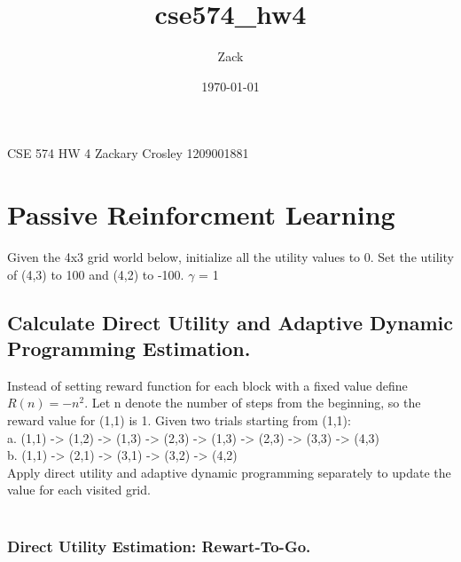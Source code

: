 \documentclass[a4paper]{article}
\author{Zack}
\date{\today}
\title{cse574\_hw4}
\begin{document}
\maketitle
\tableofcontents

CSE 574
HW 4
Zackary Crosley
1209001881

\section{Passive Reinforcment Learning}
\label{sec-1}
Given the 4x3 grid world below, initialize all the utility values to 0. Set the utility of (4,3) to 100 and (4,2) to -100. $\gamma$ = 1

\subsection{Calculate Direct Utility and Adaptive Dynamic Programming Estimation.}
\label{sec-1-1}
Instead of setting reward function for each block with a fixed value define $R(n) = -n^2$. Let n denote the number of steps from the beginning, so the reward value for (1,1) is 1. Given two trials starting from (1,1): \\
   a. (1,1) -> (1,2) -> (1,3) -> (2,3) -> (1,3) -> (2,3) -> (3,3) -> (4,3) \\
   b. (1,1) -> (2,1) -> (3,1) -> (3,2) -> (4,2) \\
Apply direct utility and adaptive dynamic programming separately to update the value for each visited grid.\\
\\
\subsubsection{Direct Utility Estimation: Rewart-To-Go.\\}
\label{sec-1-1-1}
\end{document}
